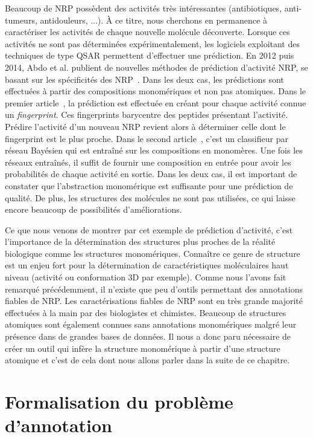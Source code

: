Beaucoup de NRP possèdent des activités très intéressantes (antibiotiques, anti-tumeurs, antidouleurs, ...).
À ce titre, nous cherchons en permanence à caractériser les activités de chaque nouvelle molécule découverte.
Lorsque ces activités ne sont pas déterminées expérimentalement, les logiciels exploitant des techniques de type QSAR permettent d'effectuer une prédiction.
En 2012 puis 2014, Abdo et al. publient de nouvelles méthodes de prédiction d'activité NRP, se basant sur les spécificités des NRP~\cite{abdo_new_2012, abdo_prediction_2014}.
Dans les deux cas, les prédictions sont effectuées à partir des compositions monomériques et non pas atomiques.
Dans le premier article~\cite{abdo_new_2012}, la prédiction est effectuée en créant pour chaque activité connue un \textit{fingerprint}.
Ces fingerprints barycentre des peptides présentant l'activité.
Prédire l'activité d'un nouveau NRP revient alors à déterminer celle dont le fingerprint est le plus proche.
Dans le second article~\cite{abdo_prediction_2014}, c'est un classifieur par réseau Bayésien qui est entraîné sur les compositions en monomères.
Une fois les réseaux entraînés, il suffit de fournir une composition en entrée pour avoir les probabilités de chaque activité en sortie.
Dans les deux cas, il est important de constater que l'abstraction monomérique est suffisante pour une prédiction de qualité.
De plus, les structures des molécules ne sont pas utilisées, ce qui laisse encore beaucoup de possibilités d'améliorations.

Ce que nous venons de montrer par cet exemple de prédiction d'activité, c'est l'importance de la détermination des structures plus proches de la réalité biologique comme les structures monomériques.
Connaître ce genre de structure est un enjeu fort pour la détermination de caractéristiques moléculaires haut niveau (activité ou conformation 3D par exemple).
Comme nous l'avons fait remarqué précédemment, il n'existe que peu d'outils permettant des annotations fiables de NRP.
Les caractérisations fiables de NRP sont en très grande majorité effectuées à la main par des biologistes et chimistes.
Beaucoup de structures atomiques sont également connues sans annotations monomériques malgré leur présence dans de grandes bases de données.
Il nous a donc paru nécessaire de créer un outil qui infère la structure monomérique à partir d'une structure atomique et c'est de cela dont nous allons parler dans la suite de ce chapitre.




\section{Formalisation du problème d'annotation}

